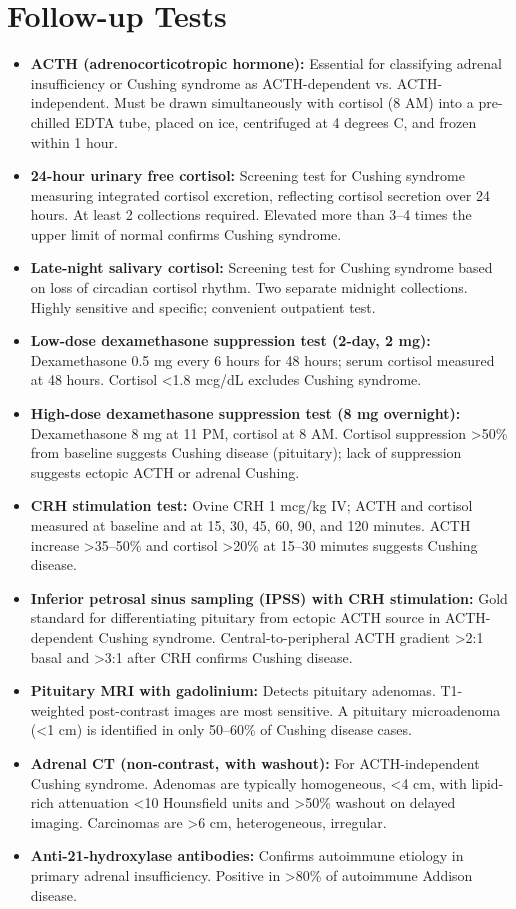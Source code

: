\section*{Follow-up Tests}
\begin{itemize}
  \item \textbf{ACTH (adrenocorticotropic hormone):} Essential for classifying adrenal insufficiency or Cushing syndrome as ACTH-dependent vs. ACTH-independent. Must be drawn simultaneously with cortisol (8 AM) into a pre-chilled EDTA tube, placed on ice, centrifuged at 4 degrees C, and frozen within 1 hour.
  \item \textbf{24-hour urinary free cortisol:} Screening test for Cushing syndrome measuring integrated cortisol excretion, reflecting cortisol secretion over 24 hours. At least 2 collections required. Elevated more than 3--4 times the upper limit of normal confirms Cushing syndrome.
  \item \textbf{Late-night salivary cortisol:} Screening test for Cushing syndrome based on loss of circadian cortisol rhythm. Two separate midnight collections. Highly sensitive and specific; convenient outpatient test.
  \item \textbf{Low-dose dexamethasone suppression test (2-day, 2 mg):} Dexamethasone 0.5 mg every 6 hours for 48 hours; serum cortisol measured at 48 hours. Cortisol <1.8 mcg/dL excludes Cushing syndrome.
  \item \textbf{High-dose dexamethasone suppression test (8 mg overnight):} Dexamethasone 8 mg at 11 PM, cortisol at 8 AM. Cortisol suppression >50\% from baseline suggests Cushing disease (pituitary); lack of suppression suggests ectopic ACTH or adrenal Cushing.
  \item \textbf{CRH stimulation test:} Ovine CRH 1 mcg/kg IV; ACTH and cortisol measured at baseline and at 15, 30, 45, 60, 90, and 120 minutes. ACTH increase >35--50\% and cortisol >20\% at 15--30 minutes suggests Cushing disease.
  \item \textbf{Inferior petrosal sinus sampling (IPSS) with CRH stimulation:} Gold standard for differentiating pituitary from ectopic ACTH source in ACTH-dependent Cushing syndrome. Central-to-peripheral ACTH gradient >2:1 basal and >3:1 after CRH confirms Cushing disease.
  \item \textbf{Pituitary MRI with gadolinium:} Detects pituitary adenomas. T1-weighted post-contrast images are most sensitive. A pituitary microadenoma (<1 cm) is identified in only 50--60\% of Cushing disease cases.
  \item \textbf{Adrenal CT (non-contrast, with washout):} For ACTH-independent Cushing syndrome. Adenomas are typically homogeneous, <4 cm, with lipid-rich attenuation <10 Hounsfield units and >50\% washout on delayed imaging. Carcinomas are >6 cm, heterogeneous, irregular.
  \item \textbf{Anti-21-hydroxylase antibodies:} Confirms autoimmune etiology in primary adrenal insufficiency. Positive in >80\% of autoimmune Addison disease.
\end{itemize}

